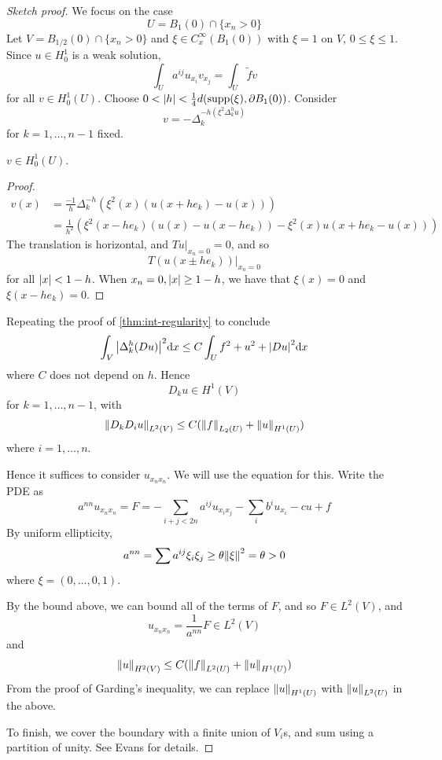 \documentclass{article}
\begin{document}
\begin{proof}
    [Sketch proof] We focus on the case
    \[U = B_1(0) \cap \{x_n > 0\}\]
    Let \(V = B_{1/2}(0) \cap \{x_n > 0\}\) and \(\xi \in C_x^\infty(B_1(0))\) with \(\xi = 1\) on \(V\), \(0 \le \xi \le 1\). Since \(u \in H^1_0\) is a weak solution,
    \[\int_U a^{ij}u_{x_i}v_{x_j} = \int_U \tilde f v\]
    for all \(v \in H_0^1(U)\). Choose \(0 < \abs{h} < \frac{1}{4}d(\operatorname{supp}(\xi), \partial B_1(0))\). Consider
    \[v = -\Delta_k^{-h(\xi^2\Delta_k^hu)}\]
    for \(k = 1, \dots, n-1\) fixed.

    \begin{claim*}
        \(v \in H_0^1(U)\).
    \end{claim*}

    \begin{proof}
        \begin{align*}
            v(x) &= \frac{-1}{h}\Delta_k^{-h}(\xi^2(x)(u(x + he_k) - u(x))) \\
            &= \frac{1}{h^2}\left(\xi^2(x - h e_k)(u(x) - u(x - h e_k)) - \xi^2(x)u(x + he_k - u(x))\right)
        \end{align*}
        The translation is horizontal, and \(Tu\vert_{x_n = 0} = 0\), and so
        \[T(u(x \pm he_k))\vert_{x_n = 0}\]
        for all \(\abs{x} < 1 - h\). When \(x_n = 0, \abs{x} \ge 1 - h\), we have that \(\xi(x) = 0\) and \(\xi(x - he_k) = 0\).
    \end{proof}
    Repeating the proof of \cref{thm:int-regularity} to conclude
    \[\int_V\abs{\Delta_k^h(Du)}^2\dd x \le C\int_U f^2 + u^2 + \abs{Du}^2 \dd x\]
    where \(C\) does not depend on \(h\). Hence
    \[D_ku \in H^1(V)\]
    for \(k = 1, \dots, n-1\), with
    \[\norm{D_kD_iu}_{L^2(V)} \le C(\norm{f}_{L_2(U)} + \norm{u}_{H^1(U)})\]
    where \(i = 1, \dots, n\).

    Hence it suffices to consider \(u_{x_nx_n}\). We will use the equation for this. Write the PDE as
    \[a^{nn}u_{x_nx_n} = F = - \sum_{i + j < 2n}a^{ij}u_{x_ix_j} - \sum_i b^iu_{x_i} - cu + f\]
    By uniform ellipticity,
    \[a^{nn} = \sum a^{ij}\xi_i\xi_j \ge \theta\norm{\xi}^2 = \theta > 0\]
    where \(\xi = (0, \dots, 0, 1)\).

    By the bound above, we can bound all of the terms of \(F\), and so \(F \in L^2(V)\), and
    \[u_{x_nx_n} = \frac{1}{a^{nn}}F \in L^2(V)\]
    and
    \[\norm{u}_{H^2(V)} \le C(\norm{f}_{L^2(U)} + \norm{u}_{H^1(U)})\]
    From the proof of Garding's inequality, we can replace \(\norm{u}_{H^1(U)}\) with \(\norm{u}_{L^2(U)}\) in the above.

    To finish, we cover the boundary with a finite union of \(V_i\)s, and sum using a partition of unity. See Evans for details.
\end{proof}
\end{document}
